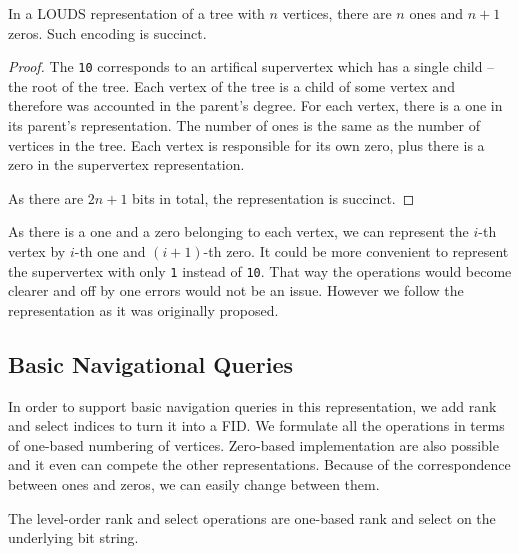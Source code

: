 \begin{lemma}
	In a LOUDS representation of a tree with $n$ vertices, there are $n$ ones and $n+1$ zeros.
	Such encoding is succinct.
\end{lemma}
\begin{proof}
	The \verb|10| corresponds to an artifical supervertex which has a single child -- the root of the tree.
	Each vertex of the tree is a child of some vertex and therefore was accounted in the parent's degree.
	For each vertex, there is a one in its parent's representation.
	The number of ones is the same as the number of vertices in the tree.
	Each vertex is responsible for its own zero, plus there is a zero in the supervertex representation.
	
	As there are $2n+1$ bits in total, the representation is succinct.
\end{proof}

As there is a one and a zero belonging to each vertex, we can represent the $i$-th vertex by $i$-th one and $(i+1)$-th zero.
It could be more convenient to represent the supervertex with only \verb|1| instead of \verb|10|.
That way the operations would become clearer and off by one errors would not be an issue.
However we follow the representation as it was originally proposed.

\subsection{Basic Navigational Queries}

In order to support basic navigation queries in this representation, we add rank and select indices to turn it into a FID.
We formulate all the operations in terms of one-based numbering of vertices.
Zero-based implementation are also possible  and it even can compete the other representations.
Because of the correspondence between ones and zeros, we can easily change between them.

\begin{algorithmic}
	\State {}
\EndFunction
\end{algorithmic}

\begin{algorithmic}
	\State {}
\EndFunction
\end{algorithmic}

The level-order rank and select operations are one-based rank and select on the underlying bit string.

